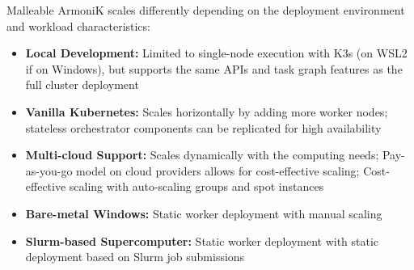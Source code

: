 \begin{frame}{Malleable}
	ArmoniK scales differently depending on the deployment environment and workload characteristics:
	\begin{itemize}
		\item \textbf{Local Development:} Limited to single-node execution with K3s (on WSL2 if on Windows), but supports the same APIs and task graph features as the full cluster deployment
		\item \textbf{Vanilla Kubernetes:} Scales horizontally by adding more worker nodes; stateless orchestrator components can be replicated for high availability
		\item \textbf{Multi-cloud Support:} Scales dynamically with the computing needs; Pay-as-you-go model on cloud providers allows for cost-effective scaling; Cost-effective scaling with auto-scaling groups and spot instances
		\item \textbf{Bare-metal Windows:} Static worker deployment with manual scaling
		\item \textbf{Slurm-based Supercomputer:} Static worker deployment with static deployment based on Slurm job submissions
	\end{itemize}
\end{frame}

